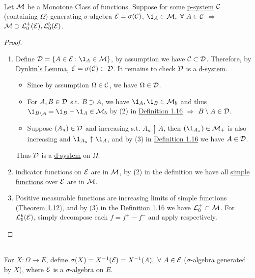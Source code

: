 \vspace{6pt}
\begin{theorem}\label{1.17}\ \\
Let $\mathcal{M}$ be a Monotone Class of functions. Suppose for some \underline{p-system} $\mathcal{C}$ (containing $\Omega$) generating $\sigma$-algebra $\mathcal{E} =\sigma(\mathcal{C})$, $\1_A \in \Ms,\ \forall\ A \in \Cs$ $\Rightarrow$ $\mathcal{M} \supset \mathcal{L}_0^+ (\mathcal{E}), \mathcal{L}_0^{b} (\mathcal{E})$.
\end{theorem}
\begin{proof}\ 
\begin{enumerate}[label = (\arabic*)]
    \item Define $\Ds = \{A \in \Es: \1_A \in \Ms\}$, by assumption we have $\mathcal{C} \subset \mathcal{D}$. Therefore, by \hyperref[Dynkin's lemma]{Dynkin's Lemma}, $\mathcal{E} = \sigma(\mathcal{C}) \subset \mathcal{D}$. It remains to check $\mathcal{D}$ is a \underline{d-system}.
    \begin{itemize}
        \item Since by assumption $\Omega \in \mathcal{C}$, we have $\Omega \in \mathcal{D}$.
        \item For $A,B \in \mathcal{D}$ s.t. $B \supset A$, we have $\1_A, \1_B \in \Ms_b$ and thus $\1_{B \setminus A} = \1_B - \1_A \in \Ms_b$ by (2) in \hyperref[1.16]{Definition 1.16} $\Rightarrow$ $B \setminus A \in \mathcal{D}$.
        \item Suppose $(A_n) \in \mathcal{D}$ and increasing s.t. $A_n \uparrow A$, then $(\1_{A_n}) \in \Ms_+$ is also increasing and $\1_{A_n} \uparrow \1_A$, and by (3) in \hyperref[1.16]{Definition 1.16} we have $A \in \mathcal{D}$.
    \end{itemize}
    Thus $\mathcal{D}$ is a \underline{d-system} on $\Omega$.
    \item indicator functions on $\mathcal{E}$ are in $\mathcal{M}$, by (2) in the definition we have all \underline{simple functions} over $\mathcal{E}$ are in $\mathcal{M}$.
    \item Positive measurable functions are increasing limits of simple functions (\hyperref[approximation of measurable functions]{Theorem 1.12}), and by (3) in the \hyperref[1.16]{Definition 1.16} we have $\mathcal{L}_0^+\subset \mathcal{M}$. For $\mathcal{L}_0^b (\mathcal{E})$, simply decompose each $f = f^+ - f^-$ and apply respectively.
\end{enumerate}
\end{proof}

\vspace{6pt}
\begin{definition}\ \\   
For $X: \Omega \to E$, define $\sigma(X) = X^{-1} (\mathcal{E}) = X^{-1} (A),\ \forall\ A \in \mathcal{E}$ ($\sigma$-algebra generated by $X$), where $\mathcal{E}$ is a $\sigma$-algebra on $E$.
\end{definition}


